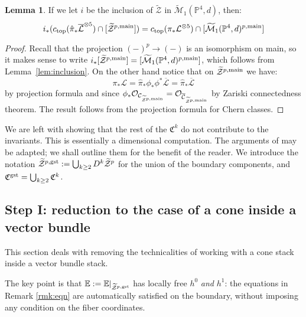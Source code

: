 \documentclass[11pt]{amsart}
\newcommand{\pazocal}{\mathcal}
\newcommand{\tM}{\widetilde{\mathcal{M}}}
\newcommand{\tZ}{\widetilde{\pazocal Z}}
\newcommand{\tZp}{\widetilde{\pazocal Z}^p}
\newcommand{\PP}{\mathbb P}
\newcommand{\OO}{\mathcal{O}}
\renewcommand{\to}{\rightarrow}
\newcommand{\cC}{\mathcal{C}}
\newcommand{\hC}{\overline{\mathcal{C}}}
\newcommand{\hL}{\overline{\mathcal{L}}}
\theoremstyle{definition}
\newtheorem{lem}[thm]{Lemma}
\theoremstyle{definition}
\begin{document}
\begin{lem}\label{lem:main-compo}
 If we let $i$ be the inclusion of $\tZ$ in $\tM_1(\PP^4,d)$, then:
 \[
  i_*(c_{\rm{top}}(\hat{\pi}_*\hL^{\otimes 5})\cap[\tZ^{p,\rm{main}}])=c_{\rm{top}}({\pi}_*\mathcal L^{\otimes 5})\cap[\tM_1(\PP^4,d)^{p,\rm{main}}]
 \]
\end{lem}
\begin{proof}
 Recall that the projection $(-)^p\to (-)$ is an isomorphism on main, so it makes sense to write $i_*[\tZ^{p,\rm{main}}]=[\tM_1(\PP^4,d)^{p,\rm{main}}]$, which follows from Lemma~\ref{lem:inclusion}. On the other hand notice that on $\tZ^{p,\rm{main}}$ we have:
 \[
  \pi_*\mathcal L=\hat{\pi}_*\phi_*\phi^*\hL=\hat{\pi}_*\hL
 \]
by projection formula and since $\phi_*\OO_{\cC_{\tZ^{p,\rm{main}}}}=\OO_{\hC_{\tZ^{p,\rm{main}}}}$ by Zariski connectedness theorem. The result follows from the projection formula for Chern classes.
\end{proof}

We are left with showing that the rest of the $\mathfrak C^k$ do not contribute to the invariants. This is essentially a dimensional computation. The arguments of \cite[\S\S6-8]{CLpfields} may be adapted; we shall outline them for the benefit of the reader. We introduce the notation $\tZ^{p,\rm{gst}}:=\bigcup_{k\geq 2} D^k\tZp$ for the union of the boundary components, and $\mathfrak C^{\rm{gst}}=\bigcup_{k\geq 2}\mathfrak C^k$.

\subsection*{Step I: reduction to the case of a cone inside a vector bundle}

This section deals with removing the technicalities of working with a cone stack inside a vector bundle stack.

The key point is that $\mathbb E:=\mathbb E\rvert_{\tZ^{p,\rm{gst}}}$ has locally free $h^0$ \emph{and} $h^1$: the equations in Remark \ref{rmk:eqn} are automatically satisfied on the boundary, without imposing any condition on the fiber coordinates.
\end{document}
